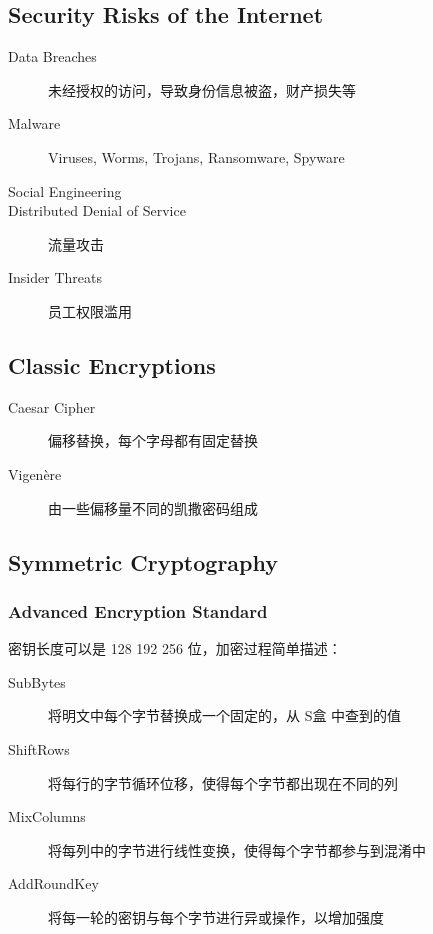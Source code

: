 \documentclass[11pt,journal,compsoc]{IEEEtran}
\begin{document}
\subsection{Security Risks of the Internet}

\begin{description}
    \item[Data Breaches] 未经授权的访问，导致身份信息被盗，财产损失等

    \item[Malware] Viruses, Worms, Trojans, Ransomware, Spyware

    \item[Social Engineering]

    \item[Distributed Denial of Service] 流量攻击

    \item[Insider Threats] 员工权限滥用
\end{description}


\subsection{Classic Encryptions}

\begin{description}
    \item[Caesar Cipher] 偏移替换，每个字母都有固定替换

    \item[Vigenère] 由一些偏移量不同的凯撒密码组成
\end{description}


\subsection{Symmetric Cryptography}


\subsubsection{Advanced Encryption Standard}

密钥长度可以是 128 192 256 位，加密过程简单描述：

\begin{description}
    \item[SubBytes] 将明文中每个字节替换成一个固定的，从 S盒 中查到的值
    
    \item[ShiftRows] 将每行的字节循环位移，使得每个字节都出现在不同的列

    \item[MixColumns] 将每列中的字节进行线性变换，使得每个字节都参与到混淆中

    \item[AddRoundKey] 将每一轮的密钥与每个字节进行异或操作，以增加强度
\end{description}
\end{document}

